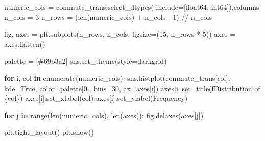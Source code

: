 \documentclass[
  number]{elsarticle}
\newenvironment{Shaded}{\begin{snugshade}}{\end{snugshade}}
\newcommand{\BuiltInTok}[1]{\textcolor[rgb]{0.00,0.23,0.31}{#1}}
\newcommand{\ControlFlowTok}[1]{\textcolor[rgb]{0.00,0.23,0.31}{\textbf{#1}}}
\newcommand{\DecValTok}[1]{\textcolor[rgb]{0.68,0.00,0.00}{#1}}
\newcommand{\KeywordTok}[1]{\textcolor[rgb]{0.00,0.23,0.31}{\textbf{#1}}}
\newcommand{\NormalTok}[1]{\textcolor[rgb]{0.00,0.23,0.31}{#1}}
\newcommand{\OperatorTok}[1]{\textcolor[rgb]{0.37,0.37,0.37}{#1}}
\newcommand{\SpecialCharTok}[1]{\textcolor[rgb]{0.37,0.37,0.37}{#1}}
\newcommand{\SpecialStringTok}[1]{\textcolor[rgb]{0.13,0.47,0.30}{#1}}
\newcommand{\StringTok}[1]{\textcolor[rgb]{0.13,0.47,0.30}{#1}}
\newcommand{\VariableTok}[1]{\textcolor[rgb]{0.07,0.07,0.07}{#1}}
\begin{document}
\begin{Shaded}
\begin{Highlighting}[]
\NormalTok{numeric\_cols }\OperatorTok{=}\NormalTok{ commute\_trans.select\_dtypes(}
\NormalTok{    include}\OperatorTok{=}\NormalTok{[}\StringTok{\textquotesingle{}float64\textquotesingle{}}\NormalTok{, }\StringTok{\textquotesingle{}int64\textquotesingle{}}\NormalTok{]).columns}
\NormalTok{n\_cols }\OperatorTok{=} \DecValTok{3}
\NormalTok{n\_rows }\OperatorTok{=}\NormalTok{ (}\BuiltInTok{len}\NormalTok{(numeric\_cols) }\OperatorTok{+}\NormalTok{ n\_cols }\OperatorTok{{-}} \DecValTok{1}\NormalTok{) }\OperatorTok{//}\NormalTok{ n\_cols}

\NormalTok{fig, axes }\OperatorTok{=}\NormalTok{ plt.subplots(n\_rows, n\_cols, figsize}\OperatorTok{=}\NormalTok{(}\DecValTok{15}\NormalTok{, n\_rows }\OperatorTok{*} \DecValTok{5}\NormalTok{))}
\NormalTok{axes }\OperatorTok{=}\NormalTok{ axes.flatten()}

\NormalTok{palette }\OperatorTok{=}\NormalTok{ [}\StringTok{\textquotesingle{}\#69b3a2\textquotesingle{}}\NormalTok{]}
\NormalTok{sns.set\_theme(style}\OperatorTok{=}\StringTok{\textquotesingle{}darkgrid\textquotesingle{}}\NormalTok{)}

\ControlFlowTok{for}\NormalTok{ i, col }\KeywordTok{in} \BuiltInTok{enumerate}\NormalTok{(numeric\_cols):}
\NormalTok{    sns.histplot(commute\_trans[col], kde}\OperatorTok{=}\VariableTok{True}\NormalTok{,}
\NormalTok{                 color}\OperatorTok{=}\NormalTok{palette[}\DecValTok{0}\NormalTok{], bins}\OperatorTok{=}\DecValTok{30}\NormalTok{, ax}\OperatorTok{=}\NormalTok{axes[i])}
\NormalTok{    axes[i].set\_title(}\SpecialStringTok{f\textquotesingle{}Distribution of }\SpecialCharTok{\{}\NormalTok{col}\SpecialCharTok{\}}\SpecialStringTok{\textquotesingle{}}\NormalTok{)}
\NormalTok{    axes[i].set\_xlabel(col)}
\NormalTok{    axes[i].set\_ylabel(}\StringTok{\textquotesingle{}Frequency\textquotesingle{}}\NormalTok{)}

\ControlFlowTok{for}\NormalTok{ j }\KeywordTok{in} \BuiltInTok{range}\NormalTok{(}\BuiltInTok{len}\NormalTok{(numeric\_cols), }\BuiltInTok{len}\NormalTok{(axes)):}
\NormalTok{    fig.delaxes(axes[j])}

\NormalTok{plt.tight\_layout()}
\NormalTok{plt.show()}
\end{Highlighting}
\end{Shaded}
\end{document}
